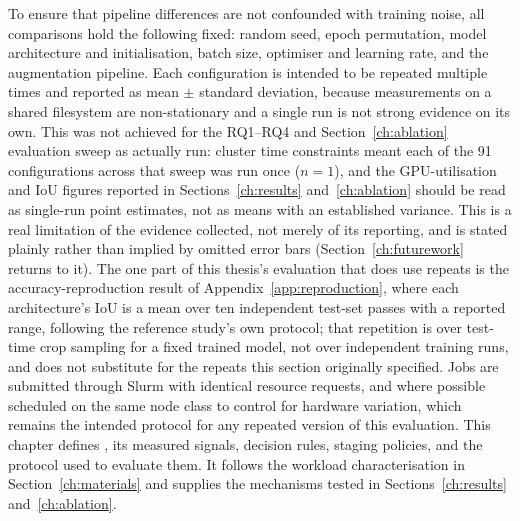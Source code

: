 To ensure that pipeline differences are not confounded with training noise, all
comparisons hold the following fixed: random seed, epoch permutation, model
architecture and initialisation, batch size, optimiser and learning rate, and the
augmentation pipeline.
Each configuration is intended to be repeated multiple times and reported as mean
$\pm$ standard deviation, because measurements on a shared filesystem are
non-stationary and a single run is not strong evidence on its own. This was not
achieved for the RQ1--RQ4 and Section~\ref{ch:ablation} evaluation sweep as
actually run: cluster time constraints meant each of the 91 configurations across
that sweep was run once ($n=1$), and the GPU-utilisation and IoU figures reported
in Sections~\ref{ch:results} and~\ref{ch:ablation} should be read as single-run
point estimates, not as means with an established variance. This is a real
limitation of the evidence collected, not merely of its reporting, and is stated
plainly rather than implied by omitted error bars (Section~\ref{ch:futurework}
returns to it). The one part of this thesis's evaluation that does use repeats is
the accuracy-reproduction result of Appendix~\ref{app:reproduction}, where each
architecture's IoU is a mean over ten independent test-set passes with a reported
range, following the reference study's own protocol; that repetition is over
test-time crop sampling for a fixed trained model, not over independent training
runs, and does not substitute for the repeats this section originally specified.
Jobs are submitted through Slurm with identical resource requests, and where
possible scheduled on the same node class to control for hardware variation, which
remains the intended protocol for any repeated version of this evaluation.
This chapter defines \pads{}, its measured signals, decision rules, staging
policies, and the protocol used to evaluate them. It follows the workload
characterisation in Section~\ref{ch:materials} and supplies the mechanisms tested
in Sections~\ref{ch:results} and~\ref{ch:ablation}.

